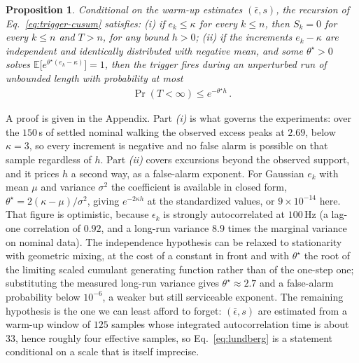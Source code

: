 \documentclass[letterpaper, 10 pt, conference]{ieeeconf}  %
\newtheorem{proposition}{Proposition}
\newcommand{\E}{\mathbb{E}}
\begin{document}
\begin{proposition} \label{prop:fpr}
Conditional on the warm-up estimates $(\bar{\epsilon}, s)$, the recursion of Eq.~\ref{eq:trigger-cusum} satisfies:
\emph{(i)} if $e_k \leq \kappa$ for every $k \leq n$, then $S_k = 0$ for every $k \leq n$ and $T > n$, for any bound $h > 0$;
\emph{(ii)} if the increments $e_k - \kappa$ are independent and identically distributed with negative mean, and some $\theta^{\star} > 0$ solves $\E\big[e^{\theta^{\star}(e_k - \kappa)}\big] = 1$, then the trigger fires during an unperturbed run of unbounded length with probability at most
\begin{align} \label{eq:lundberg}
    \Pr(T < \infty) \leq e^{-\theta^{\star} h} \,.
\end{align}
\end{proposition}

A proof is given in the Appendix.
Part \emph{(i)} is what governs the experiments: over the $150$\,s of settled nominal walking the observed excess peaks at $2.69$, below $\kappa = 3$, so every increment is negative and no false alarm is possible on that sample regardless of $h$.
Part \emph{(ii)} covers excursions beyond the observed support, and it prices $h$ a second way, as a false-alarm exponent.
For Gaussian $e_k$ with mean $\mu$ and variance $\sigma^2$ the coefficient is available in closed form, $\theta^{\star} = 2(\kappa - \mu)/\sigma^2$, giving $e^{-2\kappa h}$ at the standardized values, or $9 \times 10^{-14}$ here.
That figure is optimistic, because $\epsilon_k$ is strongly autocorrelated at $100$\,Hz (a lag-one correlation of $0.92$, and a long-run variance $8.9$ times the marginal variance on nominal data).
The independence hypothesis can be relaxed to stationarity with geometric mixing, at the cost of a constant in front and with $\theta^{\star}$ the root of the limiting scaled cumulant generating function rather than of the one-step one; substituting the measured long-run variance gives $\theta^{\star} \approx 2.7$ and a false-alarm probability below $10^{-6}$, a weaker but still serviceable exponent.
The remaining hypothesis is the one we can least afford to forget: $(\bar{\epsilon}, s)$ are estimated from a warm-up window of $125$ samples whose integrated autocorrelation time is about $33$, hence roughly four effective samples, so Eq.~\ref{eq:lundberg} is a statement conditional on a scale that is itself imprecise.
\end{document}
